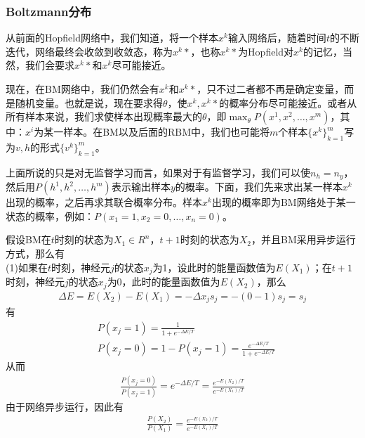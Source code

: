 {        \subsubsection{Boltzmann分布}
            \par
            从前面的Hopfield网络中，我们知道，将一个样本$x^k$输入网络后，随着时间$t$的不断迭代，网络最终会收敛到收敛态，称为$x^k*$，也称$x^k*$为Hopfield对$x^k$的记忆，当然，我们会要求$x^k*$和$x^k$尽可能接近。
            \par
            现在，在BM网络中，我们仍然会有$x^k$和$x^k*$，只不过二者都不再是确定变量，而是随机变量。也就是说，现在要求得$\theta$，使$x^k,x^k*$的概率分布尽可能接近。或者从所有样本来说，我们求使样本出现概率最大的$\theta$，即$\max_\theta P(x^1,x^2,\dots,x^m)$，其中：$x^i$为某一样本。在BM以及后面的RBM中，我们也可能将$m$个样本$\{x^k\}_{k=1}^m$写为$v,h$的形式$\{v^k\}_{k=1}^m$。
            \par
            上面所说的只是对无监督学习而言，如果对于有监督学习，我们可以使$n_h = n_y$，然后用$P(h^1,h^2,\dots,h^{m})$表示输出样本$y$的概率。下面，我们先来求出某一样本$x^k$出现的概率，之后再求其联合概率分布。样本$x^k$出现的概率即为BM网络处于某一状态的概率，例如：$P(x_1 = 1,x_2=0,\dots,x_n=0)$。
            \par
            假设BM在$t$时刻的状态为$X_1\in R^n$，$t+1$时刻的状态为$X_2$，并且BM采用异步运行方式，那么有\\
            (1)如果在$t$时刻，神经元$j$的状态$x_j$为1，设此时的能量函数值为$E(X_1)$；在$t+1$时刻，神经元$j$的状态$x_j$为0，此时的能量函数值为$E(X_2)$，那么
            \begin{align*}
            \Delta E = E(X_2) - E(X_1)= -\Delta x_j s_j = - (0-1)s_j = s_j
            \end{align*}
            有
            \begin{align*}
            & P(x_j = 1)  = \frac{1}{1+e^{-\Delta E/T}}\\
            & P(x_j = 0) = 1-P(x_j = 1)  = \frac{e^{-\Delta E/T}}{1+e^{-\Delta E/T}}
            \end{align*}
            从而
            \begin{align*}
            \frac{P(x_j = 0)}{P(x_j = 1)} = e^{-\Delta E/T} = \frac{e^{- E(X_2)/T}}{e^{- E(X_1)/T}}
            \end{align*}
            由于网络异步运行，因此有
            \begin{align*}
            \frac{P(X_2)}{P(X_1)} = \frac{e^{- E(X_2)/T}}{e^{- E(X_1)/T}}
            \end{align*}
}
